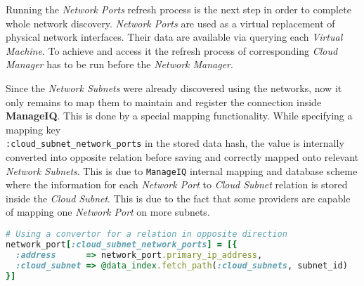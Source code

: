 Running the \emph{Network Ports} refresh process is the next step in order to complete whole network discovery. \emph{Network Ports} are used as a virtual replacement of physical network interfaces. Their data are available via querying each \emph{Virtual Machine}. To achieve and access it the refresh process of corresponding \emph{Cloud Manager} has to be run before the \emph{Network Manager}.

Since the \emph{Network Subnets} were already discovered using the networks, now it only remains to map them to maintain and register the connection inside \textbf{ManageIQ}. This is done by a special mapping functionality. While specifying a mapping key \\ \texttt{:cloud\_subnet\_network\_ports} in the stored data hash, the value is internally converted into opposite relation before saving and correctly mapped onto relevant \emph{Network Subnets}. This is due to \texttt{ManageIQ} internal mapping and database scheme where the information for each \emph{Network Port} to \emph{Cloud Subnet} relation is stored inside the \emph{Cloud Subnet}. This is due to the fact that some providers are capable of mapping one \emph{Network Port} on more subnets.

\begin{lstlisting}[language=Ruby,caption={\emph{Network port} to \emph{Cloud subnet} mapping},label=code:port_to_subnet]
# Using a convertor for a relation in opposite direction
network_port[:cloud_subnet_network_ports] = [{
  :address      => network_port.primary_ip_address,
  :cloud_subnet => @data_index.fetch_path(:cloud_subnets, subnet_id)
}]
\end{lstlisting}

